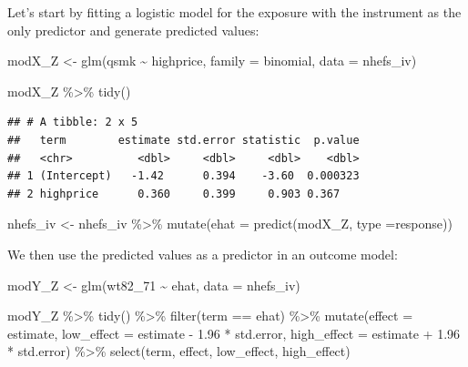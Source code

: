 \documentclass[
]{book}
\newenvironment{Shaded}{\begin{snugshade}}{\end{snugshade}}
\newcommand{\AttributeTok}[1]{\textcolor[rgb]{0.77,0.63,0.00}{#1}}
\newcommand{\FloatTok}[1]{\textcolor[rgb]{0.00,0.00,0.81}{#1}}
\newcommand{\FunctionTok}[1]{\textcolor[rgb]{0.00,0.00,0.00}{#1}}
\newcommand{\NormalTok}[1]{#1}
\newcommand{\OtherTok}[1]{\textcolor[rgb]{0.56,0.35,0.01}{#1}}
\newcommand{\SpecialCharTok}[1]{\textcolor[rgb]{0.00,0.00,0.00}{#1}}
\newcommand{\StringTok}[1]{\textcolor[rgb]{0.31,0.60,0.02}{#1}}
\begin{document}
Let's start by fitting a logistic model for the exposure with the instrument as the only predictor and generate predicted values:

\begin{Shaded}
\begin{Highlighting}[]
\NormalTok{modX\_Z }\OtherTok{\textless{}{-}} \FunctionTok{glm}\NormalTok{(qsmk }\SpecialCharTok{\textasciitilde{}}\NormalTok{ highprice, }\AttributeTok{family =}\NormalTok{ binomial, }\AttributeTok{data =}\NormalTok{ nhefs\_iv)}

\NormalTok{modX\_Z }\SpecialCharTok{\%\textgreater{}\%}
  \FunctionTok{tidy}\NormalTok{()}
\end{Highlighting}
\end{Shaded}

\begin{verbatim}
## # A tibble: 2 x 5
##   term        estimate std.error statistic  p.value
##   <chr>          <dbl>     <dbl>     <dbl>    <dbl>
## 1 (Intercept)   -1.42      0.394    -3.60  0.000323
## 2 highprice      0.360     0.399     0.903 0.367
\end{verbatim}

\begin{Shaded}
\begin{Highlighting}[]
\NormalTok{nhefs\_iv }\OtherTok{\textless{}{-}}\NormalTok{ nhefs\_iv }\SpecialCharTok{\%\textgreater{}\%}
  \FunctionTok{mutate}\NormalTok{(}\AttributeTok{ehat =} \FunctionTok{predict}\NormalTok{(modX\_Z, }\AttributeTok{type =}\StringTok{\textquotesingle{}response\textquotesingle{}}\NormalTok{))}
\end{Highlighting}
\end{Shaded}

We then use the predicted values as a predictor in an outcome model:

\begin{Shaded}
\begin{Highlighting}[]
\NormalTok{modY\_Z }\OtherTok{\textless{}{-}} \FunctionTok{glm}\NormalTok{(wt82\_71 }\SpecialCharTok{\textasciitilde{}}\NormalTok{ ehat, }\AttributeTok{data =}\NormalTok{ nhefs\_iv)}


\NormalTok{modY\_Z }\SpecialCharTok{\%\textgreater{}\%}
  \FunctionTok{tidy}\NormalTok{() }\SpecialCharTok{\%\textgreater{}\%} 
  \FunctionTok{filter}\NormalTok{(term }\SpecialCharTok{==} \StringTok{\textquotesingle{}ehat\textquotesingle{}}\NormalTok{) }\SpecialCharTok{\%\textgreater{}\%}
  \FunctionTok{mutate}\NormalTok{(}\AttributeTok{effect =}\NormalTok{ estimate,}
         \AttributeTok{low\_effect =}\NormalTok{ estimate }\SpecialCharTok{{-}} \FloatTok{1.96} \SpecialCharTok{*}\NormalTok{ std.error, }
         \AttributeTok{high\_effect =}\NormalTok{ estimate }\SpecialCharTok{+} \FloatTok{1.96} \SpecialCharTok{*}\NormalTok{ std.error) }\SpecialCharTok{\%\textgreater{}\%} 
  \FunctionTok{select}\NormalTok{(term, effect, low\_effect, high\_effect)}
\end{Highlighting}
\end{Shaded}
\end{document}
